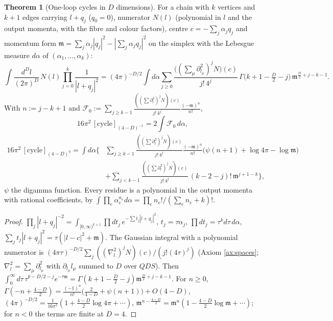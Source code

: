 \documentclass[11pt]{article}
\theoremstyle{definition}
\newtheorem{theorem}[definition]{Theorem}
\numberwithin{equation}{section}
\begin{document}
\begin{theorem}[One-loop cycles in $D$ dimensions]
\label{thm:res}
For a chain with $k$ vertices and $k+1$ edges carrying $l+q_j$ ($q_0=0$), numerator $N(l)$ (polynomial in $l$ and the output momenta, with the fibre and colour factors), centre $c=-\sum_j\alpha_jq_j$ and momentum form $\mathfrak m=\sum_j\alpha_j|q_j|^2-|\sum_j\alpha_jq_j|^2$ on the simplex with the Lebesgue measure $d\alpha$ of $(\alpha_1,\dots,\alpha_k)$:
\begin{equation}
\int\frac{d^Dl}{(2\pi)^D}\,N(l)\prod_{j=0}^k\frac1{|l+q_j|^2}=(4\pi)^{-D/2}\int d\alpha\sum_{j\ge0}\frac{\big((\sum_\mu\partial^2_{l_\mu})^jN\big)(c)}{j!\,4^j}\,\Gamma\Big(k+1-\tfrac D2-j\Big)\,\mathfrak m^{\frac D2+j-k-1}.
\label{eq:cycleD}
\end{equation}
With $n:=j-k+1$ and $\mathcal F_0:=\sum_{j\ge k-1}\frac{((\sum\partial^2_l)^jN)(c)}{j!\,4^j}\frac{(-\mathfrak m)^{n}}{n!}$,
\begin{equation}
16\pi^2\,[\text{cycle}]_{(4-D)^{-1}}=2\int\mathcal F_0\,d\alpha,
\label{eq:resD}
\end{equation}
\begin{equation}
\begin{aligned}
16\pi^2\,[\text{cycle}]_{(4-D)^{0}}=\int d\alpha\Big\{&\sum_{j\ge k-1}\frac{((\sum\partial^2_l)^jN)(c)}{j!\,4^j}\frac{(-\mathfrak m)^n}{n!}\big(\psi(n+1)+\log4\pi-\log\mathfrak m\big)\\
&+\sum_{j<k-1}\frac{((\sum\partial^2_l)^jN)(c)}{j!\,4^j}\,(k-2-j)!\,\mathfrak m^{j+1-k}\Big\},
\end{aligned}
\label{eq:finD}
\end{equation}
$\psi$ the digamma function. Every residue is a polynomial in the output momenta with rational coefficients, by $\int\prod_e\alpha_e^{n_e}d\alpha=\prod_en_e!/(\sum_en_e+k)!$.
\end{theorem}

\begin{proof}
$\prod_j|l+q_j|^{-2}=\int_{[0,\infty)^{k+1}}\prod dt_j\,e^{-\sum t_j|l+q_j|^2}$, $t_j=\tau\alpha_j$, $\prod dt_j=\tau^kd\tau\,d\alpha$, $\sum_jt_j|l+q_j|^2=\tau(|l-c|^2+\mathfrak m)$. The Gaussian integral with a polynomial numerator is $(4\pi\tau)^{-D/2}\sum_j((\nabla^2_l)^jN)(c)/(j!(4\tau)^j)$ (Axiom \ref{ax:spaces}; $\nabla^2_l=\sum_\mu\partial_{l_\mu}^2$ with $\partial_{l_\mu}l_\mu$ summed to $D$ over $QDS$). Then $\int_0^\infty d\tau\,\tau^{k-D/2-j}e^{-\tau\mathfrak m}=\Gamma(k+1-\frac D2-j)\mathfrak m^{\frac D2+j-k-1}$. For $n\ge0$, $\Gamma(-n+\frac{4-D}2)=\frac{(-1)^n}{n!}\big(\frac2{4-D}+\psi(n+1)\big)+O(4-D)$, $(4\pi)^{-D/2}=\frac1{16\pi^2}(1+\frac{4-D}2\log4\pi+\cdots)$, $\mathfrak m^{n-\frac{4-D}2}=\mathfrak m^n(1-\frac{4-D}2\log\mathfrak m+\cdots)$; for $n<0$ the terms are finite at $D=4$.
\end{proof}
\end{document}
